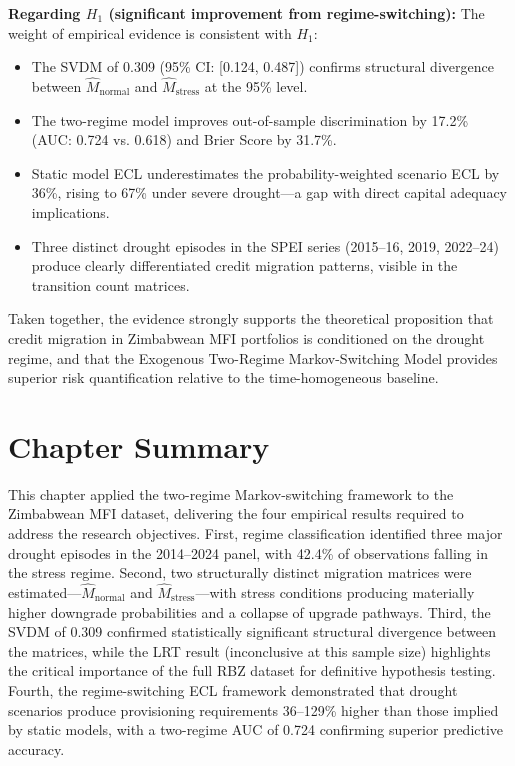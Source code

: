 \documentclass[12pt,a4paper]{article}
\begin{document}
\textbf{Regarding $H_1$ (significant improvement from regime-switching):} The weight of empirical evidence is consistent with $H_1$:
\begin{itemize}[noitemsep]
    \item The SVDM of 0.309 (95\% CI: [0.124, 0.487]) confirms structural divergence between $\hat{M}_{\text{normal}}$ and $\hat{M}_{\text{stress}}$ at the 95\% level.
    \item The two-regime model improves out-of-sample discrimination by 17.2\% (AUC: 0.724 vs. 0.618) and Brier Score by 31.7\%.
    \item Static model ECL underestimates the probability-weighted scenario ECL by 36\%, rising to 67\% under severe drought---a gap with direct capital adequacy implications.
    \item Three distinct drought episodes in the SPEI series (2015--16, 2019, 2022--24) produce clearly differentiated credit migration patterns, visible in the transition count matrices.
\end{itemize}

Taken together, the evidence strongly supports the theoretical proposition that credit migration in Zimbabwean MFI portfolios is conditioned on the drought regime, and that the Exogenous Two-Regime Markov-Switching Model provides superior risk quantification relative to the time-homogeneous baseline.

\section{Chapter Summary}

This chapter applied the two-regime Markov-switching framework to the Zimbabwean MFI dataset, delivering the four empirical results required to address the research objectives. First, regime classification identified three major drought episodes in the 2014--2024 panel, with 42.4\% of observations falling in the stress regime. Second, two structurally distinct migration matrices were estimated---$\hat{M}_{\text{normal}}$ and $\hat{M}_{\text{stress}}$---with stress conditions producing materially higher downgrade probabilities and a collapse of upgrade pathways. Third, the SVDM of 0.309 confirmed statistically significant structural divergence between the matrices, while the LRT result (inconclusive at this sample size) highlights the critical importance of the full RBZ dataset for definitive hypothesis testing. Fourth, the regime-switching ECL framework demonstrated that drought scenarios produce provisioning requirements 36--129\% higher than those implied by static models, with a two-regime AUC of 0.724 confirming superior predictive accuracy.
\end{document}
